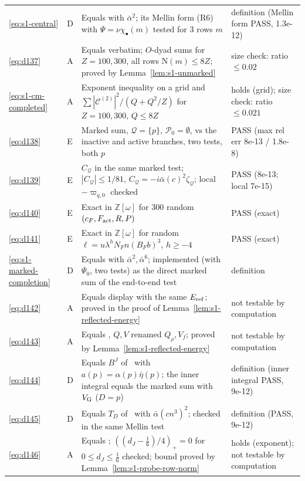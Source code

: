\documentclass[11pt]{article}
\numberwithin{equation}{section}
\newcommand{\N}{\mathrm N}
\begin{document}
\begin{longtable}{@{}>{\raggedright\arraybackslash}p{1.2cm}>{\centering\arraybackslash}p{0.7cm}>{\raggedright\arraybackslash}p{9.05cm}>{\raggedright\arraybackslash}p{4.3cm}@{}}
\eqref{eq:s1-central} & D & Equals \cite[eq.~(5.30)]{OAI78} with $\bar\alpha^2$; its Mellin form (R6) with $\Psi=\nu\chi_\bullet(m)$ tested for 3 rows $m$ & definition (Mellin form PASS, 1.3e-12)\\
\eqref{eq:d137} & A & Equals \cite[eq.~(5.36)]{OAI78} verbatim; $O$-dyad sums for $Z=100,300$, all rows $\N(m)\le8Z$; proved by Lemma~\ref{lem:s1-unmarked} & size check: ratio $\le0.02$\\
\eqref{eq:s1-cm-completed} & A & Exponent inequality on a grid and $\sum|\mathcal C^{(2)}|^2/(Q+Q^2/Z)$ for $Z=100,300$, $Q\le8Z$ & holds (grid); size check: ratio $\le0.021$\\
\eqref{eq:d138} & E & Marked sum, $\mathcal Q=\{p\}$, $\mathcal P_0=\emptyset$, vs the inactive and active branches, two tests, both $p$ & PASS (max rel err 8e-13 / 1.8e-8)\\
\eqref{eq:d139} & E & $C_{\mathcal Q}$ in the same marked test; $|C_{\mathcal Q}|\le1/81$, $C_{\mathcal Q}=-i\bar\alpha(c)^2\zeta_{\mathcal Q}$; local $-\varpi_{q,0}$ checked & PASS (8e-13; local 7e-15)\\
\eqref{eq:d140} & E & Exact in $\mathbb Z[\omega]$ for 300 random $(c_F,F_{\rm act},R,P)$ & PASS (exact)\\
\eqref{eq:d141} & E & Exact in $\mathbb Z[\omega]$ for random $\ell=u\lambda^{h}N_Fn(B_Fb)^3$, $h\ge-4$ & PASS (exact)\\
\eqref{eq:s1-marked-completion} & D & Equals \cite[eq.~(14.2)]{OAI78} with $\bar\alpha^2,\bar\alpha^6$; implemented (with $\Psi_0$, two tests) as the direct marked sum of the end-to-end test & definition\\
\eqref{eq:d142} & A & Equals \cite[Lemma~14.3]{OAI78} display with the same $E_{\rm ref}$; proved in the proof of Lemma~\ref{lem:s1-reflected-energy} & not testable by computation\\
\eqref{eq:d143} & A & Equals \cite[eq.~(14.18)]{OAI78}, $Q,V$ renamed $Q_\rho,V_f$; proved by Lemma~\ref{lem:s1-reflected-energy} & not testable by computation\\
\eqref{eq:d144} & D & Equals $B^J$ of~\cite{OAI78} with $a(p)=\alpha(p)\bar\eta(p)$; the inner integral equals the marked sum with $V_{\rm G}$ ($D=p$) & definition (inner integral PASS, 9e-12)\\
\eqref{eq:d145} & D & Equals $T_D$ of~\cite{OAI78} with $\bar\alpha(cn^3)^2$; checked in the same Mellin test & definition (PASS, 9e-12)\\
\eqref{eq:d146} & A & Equals \cite[eq.~(15.2)]{OAI78}; $((d_J-\frac16)/4)_+=0$ for $0\le d_J\le\frac16$ checked; bound proved by Lemma~\ref{lem:s1-probe-row-norm} & holds (exponent); not testable by computation\\

\end{longtable}
\end{document}
